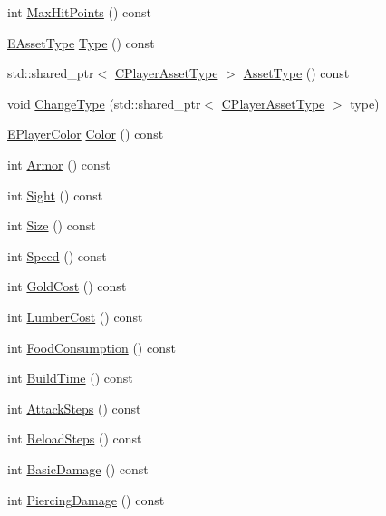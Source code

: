 \begin{DoxyCompactItemize}
\item 
int \hyperlink{classCPlayerAsset_a119a30dbc2a8e4369b9525aca812618c}{Max\+Hit\+Points} () const
\item 
\hyperlink{GameDataTypes_8h_a5600d4fc433b83300308921974477fec}{E\+Asset\+Type} \hyperlink{classCPlayerAsset_a6d6aeea4e8b02e0f239bac95db6d9e0a}{Type} () const
\item 
std\+::shared\+\_\+ptr$<$ \hyperlink{classCPlayerAssetType}{C\+Player\+Asset\+Type} $>$ \hyperlink{classCPlayerAsset_acbc2e90c81b34861edd613e4bf8325f8}{Asset\+Type} () const
\item 
void \hyperlink{classCPlayerAsset_ab67080b147a98db2cf379870cedbca2d}{Change\+Type} (std\+::shared\+\_\+ptr$<$ \hyperlink{classCPlayerAssetType}{C\+Player\+Asset\+Type} $>$ type)
\item 
\hyperlink{GameDataTypes_8h_aafb0ca75933357ff28a6d7efbdd7602f}{E\+Player\+Color} \hyperlink{classCPlayerAsset_a969e6e60c6343186d2b9a6cddd6654f8}{Color} () const
\item 
int \hyperlink{classCPlayerAsset_a3de4826a7d7e8d2c5fd325ec736567ab}{Armor} () const
\item 
int \hyperlink{classCPlayerAsset_ac732622598cbd05dd2ec9233468e2b07}{Sight} () const
\item 
int \hyperlink{classCPlayerAsset_a85a9e2ce62f557e93219676117159fec}{Size} () const
\item 
int \hyperlink{classCPlayerAsset_af1c093600f1567e3abf1cefc0f5350d5}{Speed} () const
\item 
int \hyperlink{classCPlayerAsset_aa27a1ef30ef9f6a0452f7eeea6ae9516}{Gold\+Cost} () const
\item 
int \hyperlink{classCPlayerAsset_add6700156ae77b23fcb8fa7831f897d8}{Lumber\+Cost} () const
\item 
int \hyperlink{classCPlayerAsset_ab95c988b7c13ed8c686da8f354d120f4}{Food\+Consumption} () const
\item 
int \hyperlink{classCPlayerAsset_aba613ebb3be5fd70293468198da9b30d}{Build\+Time} () const
\item 
int \hyperlink{classCPlayerAsset_a33db708bb6bf66d67b54b24c322f27fa}{Attack\+Steps} () const
\item 
int \hyperlink{classCPlayerAsset_a0c696a50d23ee7fb3fcfbf7e696c739f}{Reload\+Steps} () const
\item 
int \hyperlink{classCPlayerAsset_a17dcdcd436e6edfab325bc4dbca4f03c}{Basic\+Damage} () const
\item 
int \hyperlink{classCPlayerAsset_a1949069b1bec611fdfa74488a3d6864f}{Piercing\+Damage} () const

\end{DoxyCompactItemize}
